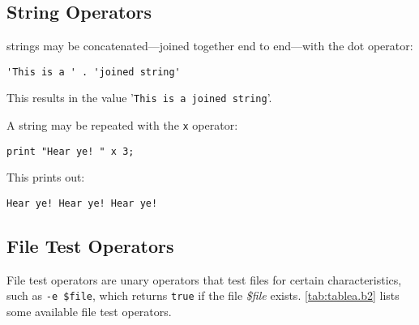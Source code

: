 \subsection{String Operators}
strings may be concatenated—joined together end to end—with the dot operator:

\begin{lstlisting}
'This is a ' . 'joined string'
\end{lstlisting}

This results in the value '\verb|This is a joined string|'.

A string may be repeated with the \verb|x| operator:

\begin{lstlisting}
print "Hear ye! " x 3;
\end{lstlisting}

This prints out:

\begin{lstlisting}
Hear ye! Hear ye! Hear ye!
\end{lstlisting}

\subsection{File Test Operators}
File test operators are unary operators that test files for certain characteristics, such as \verb|-e $file|, which returns \verb|true| if the file \textit{\$file} exists. \autoref{tab:tablea.b2} lists some available file test operators. 

